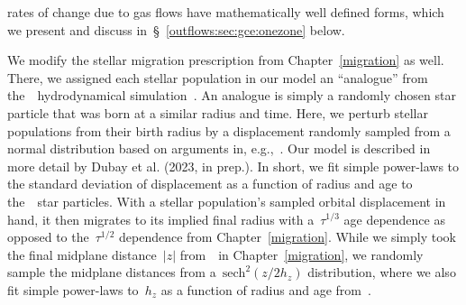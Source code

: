 rates of change due to gas flows have mathematically well defined forms,
which we present and discuss in~\S~\ref{outflows:sec:gce:onezone} below.
\par
We modify the stellar migration prescription from Chapter~\ref{migration} as
well.
There, we assigned each stellar population in our model an ``analogue'' from
the~\hsim~hydrodynamical simulation~\citep{Christensen2012, Loebman2012,
Loebman2014, Zolotov2012, Brooks2014}.
An analogue is simply a randomly chosen star particle that was born at a
similar radius and time.
Here, we perturb stellar populations from their birth radius by a displacement
randomly sampled from a normal distribution based on arguments in,
e.g.,~\citet{Frankel2018}.
Our model is described in more detail by Dubay et al. (2023, in prep.). 
In short, we fit simple power-laws to the standard deviation of displacement
as a function of radius and age to the~\hsim~star particles.
With a stellar population's sampled orbital displacement in hand, it then
migrates to its implied final radius with a~$\tau^{1/3}$ age dependence as
opposed to the~$\tau^{1/2}$ dependence from Chapter~\ref{migration}.
While we simply took the final midplane distance~$\left|z\right|$ from~\hsim~in
Chapter~\ref{migration}, we randomly sample the midplane distances from
a~$\text{sech}^2(z / 2h_z)$ distribution, where we also fit simple power-laws
to~$h_z$ as a function of radius and age from~\hsim.


